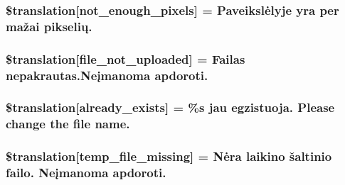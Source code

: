 \subsubsection[{\$translation}]{\setlength{\rightskip}{0pt plus 5cm}\$translation\mbox{[}\textquotesingle{}not\+\_\+enough\+\_\+pixels\textquotesingle{}\mbox{]} = \textquotesingle{}Paveikslėlyje yra per mažai pikselių.\textquotesingle{}}\label{class_8upload_8lt___l_t_8php_a1fe342c27ce61f4ff4e0120ba647033e}
\hypertarget{class_8upload_8lt___l_t_8php_a4ce76e7be0b3a03c2b47f6d70c21832e}{}
\subsubsection[{\$translation}]{\setlength{\rightskip}{0pt plus 5cm}\$translation\mbox{[}\textquotesingle{}file\+\_\+not\+\_\+uploaded\textquotesingle{}\mbox{]} = \textquotesingle{}Failas nepakrautas.\+Neįmanoma apdoroti.\textquotesingle{}}\label{class_8upload_8lt___l_t_8php_a4ce76e7be0b3a03c2b47f6d70c21832e}
\hypertarget{class_8upload_8lt___l_t_8php_afd84e910217f04139f567c41e292afa5}{}
\subsubsection[{\$translation}]{\setlength{\rightskip}{0pt plus 5cm}\$translation\mbox{[}\textquotesingle{}already\+\_\+exists\textquotesingle{}\mbox{]} = \textquotesingle{}\%s jau egzistuoja. Please change the file name.\textquotesingle{}}\label{class_8upload_8lt___l_t_8php_afd84e910217f04139f567c41e292afa5}
\hypertarget{class_8upload_8lt___l_t_8php_ab0fa87a88aba2624004581eed0633325}{}
\subsubsection[{\$translation}]{\setlength{\rightskip}{0pt plus 5cm}\$translation\mbox{[}\textquotesingle{}temp\+\_\+file\+\_\+missing\textquotesingle{}\mbox{]} = \textquotesingle{}Nėra laikino šaltinio failo. Neįmanoma apdoroti.\textquotesingle{}}\label{class_8upload_8lt___l_t_8php_ab0fa87a88aba2624004581eed0633325}
\hypertarget{class_8upload_8lt___l_t_8php_aceaaf7355acaaf10f0ae60378d03c468}{}
